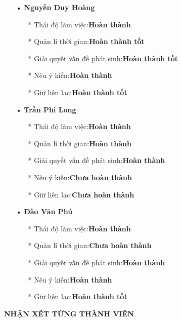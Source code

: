 \documentclass{article}
\begin{document}
\begin{itemize}
    \item [•]\textbf{Nguyễn Duy Hoàng}
    \begin{itemize}
        \item [*]Thái độ làm việc:\textbf{Hoàn thành}
        \item[*]Quản lí thời gian:\textbf{Hoàn thành tốt}
        \item[*]Giải quyết vấn đề phát sinh:\textbf{Hoàn thành tốt}
        \item[*]Nêu ý kiến:\textbf{Hoàn thành}
        \item[*]Giữ liên lạc:\textbf{Hoàn thành tốt}
    \end{itemize}
    \item[•]\textbf{Trần Phi Long}
    \begin{itemize}
        \item [*]Thái độ làm việc:\textbf{Hoàn thành}
        \item[*]Quản lí thời gian:\textbf{Hoàn thành}
        \item[*]Giải quyết vấn đề phát sinh:\textbf{Hoàn thành}
        \item[*]Nêu ý kiến:\textbf{Chưa hoàn thành}
        \item[*]Giữ liên lạc:\textbf{Chưa hoàn thành}
    \end{itemize}
    \item[•]\textbf{Đào Văn Phú}
    \begin{itemize}
        \item [*]Thái độ làm việc:\textbf{Hoàn thành}
        \item[*]Quản lí thời gian:\textbf{Chưa hoàn thành}
        \item[*]Giải quyết vấn đề phát sinh:\textbf{Hoàn thành}
        \item[*]Nêu ý kiến:\textbf{Hoàn thành}
        \item[*]Giữ liên lạc:\textbf{Hoàn thành tốt}
        
    \end{itemize}
\end{itemize}
\textbf{NHẬN XÉT TỪNG THÀNH VIÊN}
\end{document}
